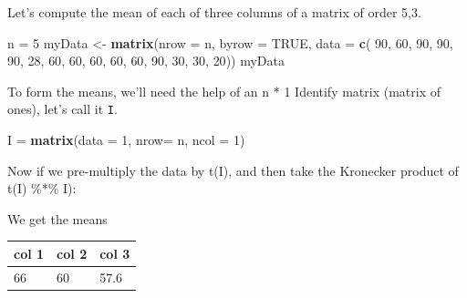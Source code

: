 \documentclass[11pt,]{article}
\newenvironment{Shaded}{\begin{snugshade}}{\end{snugshade}}
\newcommand{\KeywordTok}[1]{\textcolor[rgb]{0.13,0.29,0.53}{\textbf{#1}}}
\newcommand{\DataTypeTok}[1]{\textcolor[rgb]{0.13,0.29,0.53}{#1}}
\newcommand{\DecValTok}[1]{\textcolor[rgb]{0.00,0.00,0.81}{#1}}
\newcommand{\StringTok}[1]{\textcolor[rgb]{0.31,0.60,0.02}{#1}}
\newcommand{\CommentTok}[1]{\textcolor[rgb]{0.56,0.35,0.01}{\textit{#1}}}
\newcommand{\OtherTok}[1]{\textcolor[rgb]{0.56,0.35,0.01}{#1}}
\newcommand{\OperatorTok}[1]{\textcolor[rgb]{0.81,0.36,0.00}{\textbf{#1}}}
\newcommand{\NormalTok}[1]{#1}
\begin{document}
Let's compute the mean of each of three columns of a matrix of order
5,3.

\begin{Shaded}
\begin{Highlighting}[]
\NormalTok{n =}\StringTok{ }\DecValTok{5}
\NormalTok{myData <-}\StringTok{ }\KeywordTok{matrix}\NormalTok{(}\DataTypeTok{nrow =}\NormalTok{ n, }\DataTypeTok{byrow =} \OtherTok{TRUE}\NormalTok{, }\DataTypeTok{data =} \KeywordTok{c}\NormalTok{(}
\DecValTok{90}\NormalTok{, }\DecValTok{60}\NormalTok{, }\DecValTok{90}\NormalTok{, }
\DecValTok{90}\NormalTok{, }\DecValTok{90}\NormalTok{, }\DecValTok{28}\NormalTok{, }
\DecValTok{60}\NormalTok{, }\DecValTok{60}\NormalTok{, }\DecValTok{60}\NormalTok{, }
\DecValTok{60}\NormalTok{, }\DecValTok{60}\NormalTok{, }\DecValTok{90}\NormalTok{, }
\DecValTok{30}\NormalTok{, }\DecValTok{30}\NormalTok{, }\DecValTok{20}\NormalTok{))}
\NormalTok{myData}
\end{Highlighting}
\end{Shaded}

To form the means, we'll need the help of an n * 1 Identify matrix
(matrix of ones), let's call it \texttt{I}.

\begin{Shaded}
\begin{Highlighting}[]
\NormalTok{I =}\StringTok{ }\KeywordTok{matrix}\NormalTok{(}\DataTypeTok{data =} \DecValTok{1}\NormalTok{, }\DataTypeTok{nrow=}\NormalTok{ n, }\DataTypeTok{ncol =} \DecValTok{1}\NormalTok{)}
\end{Highlighting}
\end{Shaded}

Now if we pre-multiply the data by t(I), and then take the Kronecker
product of t(I) \%*\% I):

\begin{Shaded}
\end{Shaded}

We get the means

\begin{longtable}[]{@{}lll@{}}
\toprule
col 1 & col 2 & col 3\tabularnewline
\midrule
\endhead
66 & 60 & 57.6\tabularnewline
\bottomrule
\end{longtable}
\end{document}
